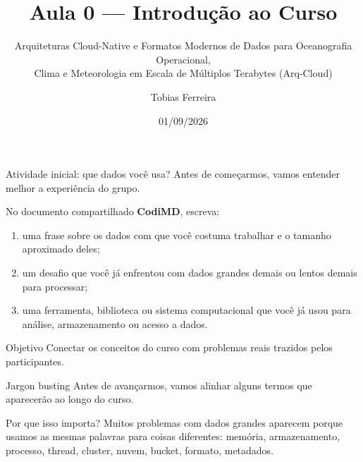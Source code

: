 \documentclass[aspectratio=169]{beamer}
\title[Introdução ao Curso]{Aula 0 --- Introdução ao Curso}
\subtitle{Arquiteturas Cloud-Native e Formatos Modernos de Dados para Oceanografia Operacional,\\
Clima e Meteorologia em Escala de Múltiplos Terabytes (Arq-Cloud)}
\author{Tobias Ferreira}
\institute{Instituto Nacional de Pesquisas Oceânicas (INPO)}
\date{01/09/2026}
\begin{document}
\begin{frame}
  \titlepage
\end{frame}

\begin{frame}{Atividade inicial: que dados você usa?}
Antes de começarmos, vamos entender melhor a experiência do grupo.

\vspace{0.3cm}

No documento compartilhado \textbf{CodiMD}, escreva:

\begin{enumerate}
  \item uma frase sobre os dados com que você costuma trabalhar e o tamanho aproximado deles;
  \item um desafio que você já enfrentou com dados grandes demais ou lentos demais para processar;
  \item uma ferramenta, biblioteca ou sistema computacional que você já usou para análise, armazenamento ou acesso a dados.
\end{enumerate}

\vspace{0.3cm}

\begin{block}{Objetivo}
Conectar os conceitos do curso com problemas reais trazidos pelos participantes.
\end{block}
\end{frame}

\begin{frame}{Jargon busting}
\Large
Antes de avançarmos, vamos alinhar alguns termos que aparecerão ao longo do curso.

\vspace{0.5cm}

\begin{block}{Por que isso importa?}
Muitos problemas com dados grandes aparecem porque usamos as mesmas palavras para coisas diferentes: memória, armazenamento, processo, thread, cluster, nuvem, bucket, formato, metadados.
\end{block}
\end{frame}
\end{document}
